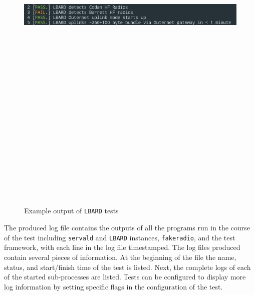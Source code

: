 \begin{figure}
    \begin{centering}
        \includegraphics[width=14cm,height=20cm,keepaspectratio]{Figures/testOutput1.png}
        \caption{Example output of \texttt{LBARD} tests}
        \label{fig:exampleTest}
    \end{centering}
\end{figure}

The produced log file contains the outputs of all the programs run in the course of the test including \texttt{servald} and \texttt{LBARD} instances, \texttt{fakeradio}, and the test framework, with each line in the log file timestamped.
The log files produced contain several pieces of information.
At the beginning of the file the name, status, and start/finish time of the test is listed.
Next, the complete logs of each of the started sub-processes are listed.
Tests can be configured to display more log information by setting specific flags in the configuration of the test.


